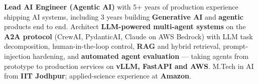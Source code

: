 \documentclass[letter,10pt]{article}
\begin{document}

\textbf{Lead AI Engineer (Agentic AI)} with 5+ years of production experience shipping AI systems, including 3 years building \textbf{Generative AI} and \textbf{agentic} products end to end.
Architect \textbf{LLM-powered multi-agent systems} on the \textbf{A2A protocol} (CrewAI, PydanticAI, Claude on AWS Bedrock) with LLM task decomposition, human-in-the-loop control, \textbf{RAG} and hybrid retrieval, prompt-injection hardening, and \textbf{automated agent evaluation} — taking agents from prototype to production services on \textbf{vLLM, FastAPI and AWS}.
M.Tech in AI from \textbf{IIT Jodhpur}; applied-science experience at \textbf{Amazon}.
\end{document}
